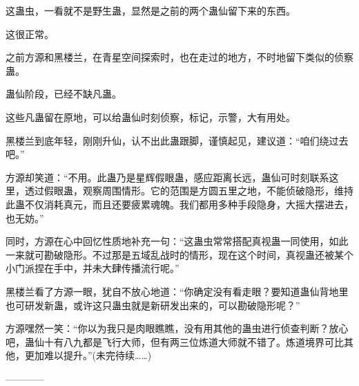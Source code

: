 \begin{this_body}
这蛊虫，一看就不是野生蛊，显然是之前的两个蛊仙留下来的东西。

这很正常。

之前方源和黑楼兰，在青星空间探索时，也在走过的地方，不时地留下类似的侦察蛊。

蛊仙阶段，已经不缺凡蛊。

这些凡蛊留在原地，可以给蛊仙时刻侦察，标记，示警，大有用处。

黑楼兰到底年轻，刚刚升仙，认不出此蛊跟脚，谨慎起见，建议道：“咱们绕过去吧。”

方源却笑道：“不用。此蛊乃是星辉假眼蛊，感应距离长远，蛊仙可时刻联系这里，透过假眼蛊，观察周围情形。它的范围是方圆五里之地，不能侦破隐形，维持此蛊不仅消耗真元，而且还要疲累魂魄。我们都用多种手段隐身，大摇大摆进去，也无妨。”

同时，方源在心中回忆性质地补充一句：“这蛊虫常常搭配真视蛊一同使用，如此一来就可勘破隐形。不过那是五域乱战时的情形，现在这个时间，真视蛊还被某个小门派捏在手中，并未大肆传播流行呢。”

黑楼兰看了方源一眼，犹自不放心地道：“你确定没有看走眼？要知道蛊仙背地里也可研发新蛊，或许这只蛊虫就是新研发出来的，可以勘破隐形呢？”

方源嘿然一笑：“你以为我只是肉眼瞧瞧，没有用其他的蛊虫进行侦查判断？放心吧，蛊仙十有八九都是飞行大师，但有两三位炼道大师就不错了。炼道境界可比其他，更加难以提升。”(未完待续……)

------------

\end{this_body}

